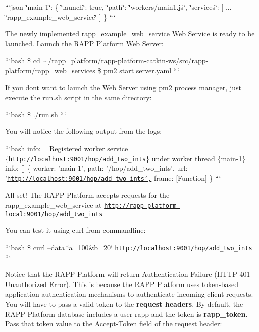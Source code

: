 ```json \char`\"{}main-\/1\char`\"{}\-: \{ \char`\"{}launch\char`\"{}\-: true, \char`\"{}path\char`\"{}\-: \char`\"{}workers/main1.\-js\char`\"{}, \char`\"{}services\char`\"{}\-: \mbox{[} ... \char`\"{}rapp\-\_\-example\-\_\-web\-\_\-service\char`\"{} \mbox{]} \} ```

The newly implemented {\ttfamily rapp\-\_\-example\-\_\-web\-\_\-service} Web Service is ready to be launched. Launch the R\-A\-P\-P Platform Web Server\-:

```bash \$ cd $\sim$/rapp\-\_\-platform/rapp-\/platform-\/catkin-\/ws/src/rapp-\/platform/rapp\-\_\-web\-\_\-services \$ pm2 start server.\-yaml ```

If you dont want to launch the Web Server using pm2 process manager, just execute the {\ttfamily run.\-sh} script in the same directory\-:

```bash \$ ./run.sh ```

You will notice the following output from the logs\-:

```bash info\-: \mbox{[}\mbox{]} Registered worker service \{\href{http://localhost:9001/hop/add_two_ints}{\tt http\-://localhost\-:9001/hop/add\-\_\-two\-\_\-ints}\} under worker thread \{main-\/1\} info\-: \mbox{[}\mbox{]} \{ worker\-: 'main-\/1', path\-: '/hop/add\-\_\-two\-\_\-ints', url\-: '\href{http://localhost:9001/hop/add_two_ints',}{\tt http\-://localhost\-:9001/hop/add\-\_\-two\-\_\-ints',} frame\-: \mbox{[}Function\mbox{]} \} ```

All set! The R\-A\-P\-P Platform accepts requests for the {\ttfamily rapp\-\_\-example\-\_\-web\-\_\-service} at {\ttfamily \href{http://rapp-platform-local:9001/hop/add_two_ints}{\tt http\-://rapp-\/platform-\/local\-:9001/hop/add\-\_\-two\-\_\-ints}}

You can test it using {\ttfamily curl} from commandline\-:

```bash \$ curl --data \char`\"{}a=100\&b=20\char`\"{} \href{http://localhost:9001/hop/add_two_ints}{\tt http\-://localhost\-:9001/hop/add\-\_\-two\-\_\-ints} ```

Notice that the R\-A\-P\-P Platform will return {\ttfamily Authentication Failure} (H\-T\-T\-P 401 Unauthorized Error). This is because the R\-A\-P\-P Platform uses token-\/based application authentication mechanisms to authenticate incoming client requests. You will have to pass a valid token to the {\bfseries request headers}. By default, the R\-A\-P\-P Platform database includes a user {\ttfamily rapp} and the token is {\bfseries rapp\-\_\-token}. Pass that token value to the {\ttfamily Accept-\/\-Token} field of the request header\-:


